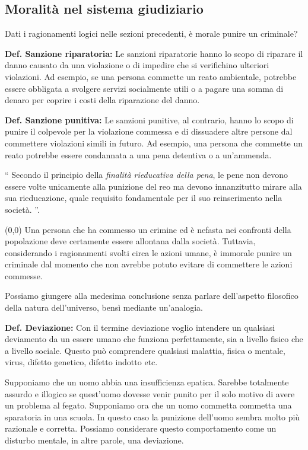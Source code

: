 \documentclass[a4paper, 12pt]{article}
\newcommand{\ownright}[0]{%
    \makebox(0,0){
        \stackon[8pt]{\phantom{A}}{
            \begin{tikzpicture}
                \fill (0,0) -- (0,0.3) -- ++(0.05,0) -- (0.05,0);
                \fill (0,0.3) -- ++(0.3,0) -- (0.3,0.25) -- (0.05,0.25);
            \end{tikzpicture}
        }
    }%
}
\begin{document}
\subsection{Moralità nel sistema giudiziario}

Dati i ragionamenti logici nelle sezioni precedenti, è morale punire
un criminale?

\textbf{Def. Sanzione riparatoria:} Le sanzioni riparatorie hanno
lo scopo di riparare il danno causato da una violazione
o di impedire che si verifichino ulteriori violazioni.
Ad esempio, se una persona commette un reato ambientale,
potrebbe essere obbligata a svolgere servizi socialmente utili
o a pagare una somma di denaro per coprire i costi della riparazione del danno.

\textbf{Def. Sanzione punitiva:} Le sanzioni punitive,
al contrario, hanno lo scopo di punire il colpevole
per la violazione commessa e di dissuadere altre persone
dal commettere violazioni simili in futuro.
Ad esempio, una persona che commette un reato potrebbe essere condannata
a una pena detentiva o a un'ammenda.

\enquote{
Secondo il principio della \textit{finalità rieducativa della pena}, le pene
non devono essere volte unicamente alla punizione del reo ma
devono innanzitutto mirare alla sua rieducazione,
quale requisito fondamentale per il suo reinserimento nella società.
}\cite{rieducazione}.

\ownright{}%
Una persona che ha commesso un crimine ed è nefasta
nei confronti della popolazione deve certamente essere allontana dalla società.
Tuttavia, considerando i ragionamenti svolti circa le azioni umane,
è immorale punire un criminale dal momento che non avrebbe potuto evitare di commettere
le azioni commesse.

Possiamo giungere alla medesima conclusione senza parlare
dell'aspetto filosofico della natura dell'universo, bensì mediante un'analogia.

\textbf{Def. Deviazione:} Con il termine deviazione voglio intendere
un qualsiasi deviamento da un essere umano che funziona perfettamente,
sia a livello fisico che a livello sociale. Questo può comprendere
qualsiasi malattia, fisica o mentale, virus, difetto genetico,
difetto indotto etc.

Supponiamo che un uomo abbia una insufficienza epatica.
Sarebbe totalmente assurdo e illogico se quest'uomo dovesse venir
punito per il solo motivo di avere un problema al fegato.
Supponiamo ora che un uomo commetta commetta una sparatoria in una scuola.
In questo caso la punizione dell'uomo sembra molto più razionale e corretta.
Possiamo considerare questo comportamento come un disturbo mentale, in altre parole,
una deviazione.
\end{document}
